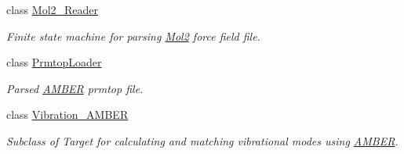 \begin{DoxyCompactItemize}
class \hyperlink{classsrc_1_1amberio_1_1Mol2__Reader}{Mol2\+\_\+\+Reader}
\begin{DoxyCompactList}\small\item\em Finite state machine for parsing \hyperlink{namespacesrc_1_1Mol2}{Mol2} force field file. \end{DoxyCompactList}\item 
class \hyperlink{classsrc_1_1amberio_1_1PrmtopLoader}{Prmtop\+Loader}
\begin{DoxyCompactList}\small\item\em Parsed \hyperlink{classsrc_1_1amberio_1_1AMBER}{A\+M\+B\+ER} prmtop file. \end{DoxyCompactList}\item 
class \hyperlink{classsrc_1_1amberio_1_1Vibration__AMBER}{Vibration\+\_\+\+A\+M\+B\+ER}
\begin{DoxyCompactList}\small\item\em Subclass of Target for calculating and matching vibrational modes using \hyperlink{classsrc_1_1amberio_1_1AMBER}{A\+M\+B\+ER}. \end{DoxyCompactList}\end{DoxyCompactItemize}
